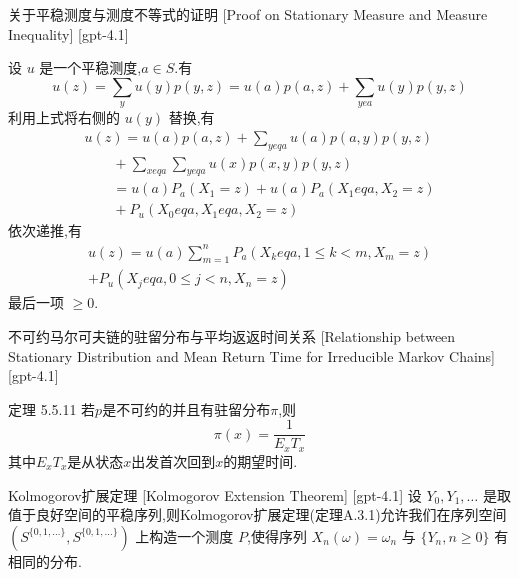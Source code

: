 \documentclass[UTF8]{ctexart}
\begin{document}
    \begin{prf}
        {关于平稳测度与测度不等式的证明}
        [Proof on Stationary Measure and Measure Inequality]
        [gpt-4.1]
        
设 $
u$ 是一个平稳测度,$a \in S$.有
\[
u(z) = \sum_{y} 
u(y) p(y, z) = 
u(a) p(a, z) + \sum_{y 
e a} 
u(y) p(y, z)
\]
利用上式将右侧的 $
u(y)$ 替换,有
\[
\begin{array}{l}

u(z) = 
u(a) p(a, z) + \displaystyle \sum_{y 
eq a} 
u(a) p(a, y) p(y, z) \\
\qquad + \displaystyle \sum_{x 
eq a} \sum_{y 
eq a} 
u(x) p(x, y) p(y, z) \\
\qquad = 
u(a) P_{a}(X_{1} = z) + 
u(a) P_{a}(X_{1} 
eq a, X_{2} = z) \\
\qquad + P_{
u}(X_{0} 
eq a, X_{1} 
eq a, X_{2} = z)
\end{array}
\]
依次递推,有
\[
\begin{array}{c}

u(z) = 
u(a) \displaystyle \sum_{m=1}^{n} P_{a}(X_{k} 
eq a, 1 \leq k < m, X_{m} = z) \\
+ P_{
u}(X_{j} 
eq a, 0 \leq j < n, X_{n} = z)
\end{array}
\]
最后一项 $\geq 0$.

    \end{prf}
    
    
    
    \begin{thm}
        {不可约马尔可夫链的驻留分布与平均返返时间关系}
        [Relationship between Stationary Distribution and Mean Return Time for Irreducible Markov Chains]
        [gpt-4.1]
        
定理 5.5.11 若$p$是不可约的并且有驻留分布$\pi$,则
\[
\pi(x) = \frac{1}{E_x T_x}
\]
其中$E_x T_x$是从状态$x$出发首次回到$x$的期望时间.

    \end{thm}
    
    
    
    \begin{thm}
        {Kolmogorov扩展定理}
        [Kolmogorov Extension Theorem]
        [gpt-4.1]
        设 $Y_{0}, Y_{1}, \ldots$ 是取值于良好空间的平稳序列,则Kolmogorov扩展定理(定理A.3.1)允许我们在序列空间 $(S^{\{0, 1, \ldots\}}, S^{\{0, 1, \ldots\}})$ 上构造一个测度 $P$,使得序列 $X_{n}(\omega) = \omega_{n}$ 与 $\{Y_{n}, n \geq 0\}$ 有相同的分布.
    \end{thm}
    
\end{document}
